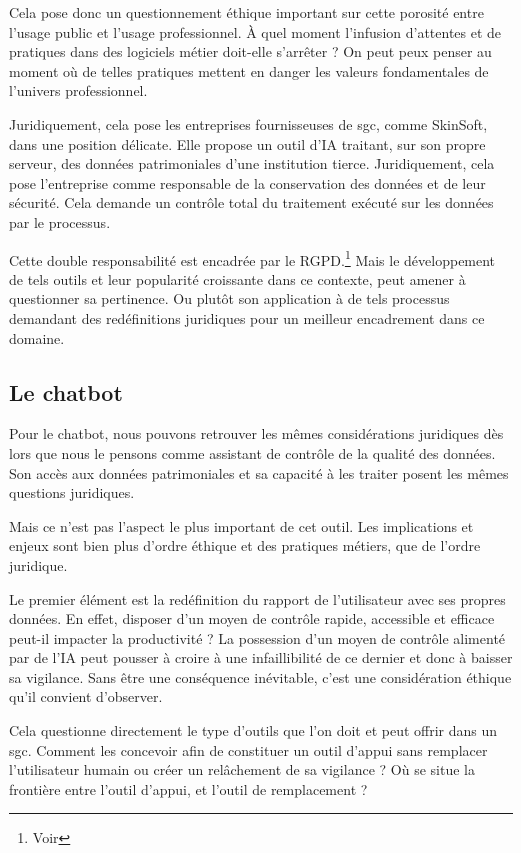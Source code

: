 Cela pose donc un questionnement éthique important sur cette porosité entre l'usage public et l'usage professionnel. À quel moment l'infusion d'attentes et de pratiques  dans des logiciels métier doit-elle s'arrêter ? On peut peux penser au moment où de telles pratiques mettent en danger les valeurs fondamentales de l'univers professionnel.\newline

Juridiquement, cela pose les entreprises fournisseuses de \gls{sgc}, comme SkinSoft, dans une position délicate. Elle propose un outil d'\gls{IA} traitant, sur son propre serveur, des données patrimoniales d'une institution tierce. Juridiquement, cela pose l'entreprise comme responsable de la conservation des données et de leur sécurité. Cela demande un contrôle total du traitement exécuté sur les données par le processus. 

Cette double responsabilité est encadrée par le \gls{RGPD}.\footnote{Voir } Mais le développement de tels outils et leur popularité croissante dans ce contexte, peut amener à questionner sa pertinence. Ou plutôt son application à de tels processus demandant des redéfinitions juridiques pour un meilleur encadrement dans ce domaine. 

\subsection{Le \gls{chatbot}}

Pour le \gls{chatbot}, nous pouvons retrouver les mêmes considérations juridiques dès lors que nous le pensons comme assistant de contrôle de la qualité des données. Son accès aux données patrimoniales et sa capacité à les traiter posent les mêmes questions juridiques. 

Mais ce n'est pas l'aspect le plus important de cet outil. Les implications et enjeux sont bien plus d'ordre éthique et des pratiques métiers, que de l'ordre juridique.

Le premier élément est la redéfinition du rapport de l'utilisateur avec ses propres données. En effet, disposer d'un moyen de contrôle rapide, accessible et efficace peut-il impacter la productivité ? La possession d'un moyen de contrôle alimenté par de l'\gls{IA} peut pousser à croire à une infaillibilité de ce dernier et donc à baisser sa vigilance. Sans être une conséquence inévitable, c'est une considération éthique qu'il convient d'observer. 

Cela questionne directement le type d'outils que l'on doit et peut offrir dans un \gls{sgc}. Comment les concevoir afin de constituer un outil d'appui sans remplacer l'utilisateur humain ou créer un relâchement de sa vigilance ? Où se situe la frontière entre l'outil d'appui, et l'outil de remplacement ? 

